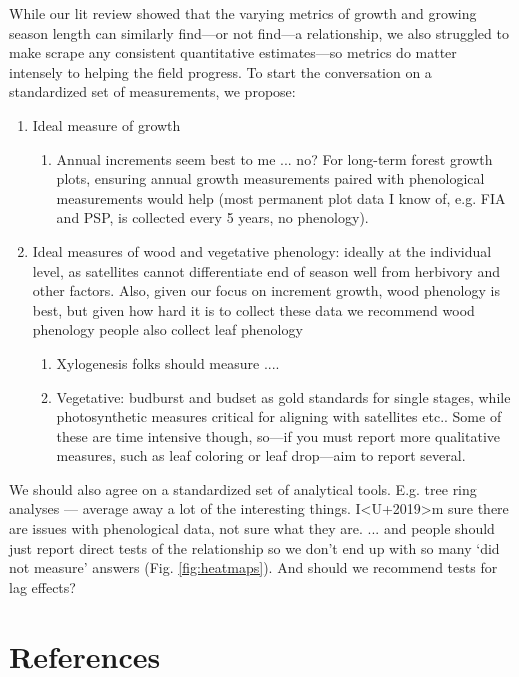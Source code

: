 \documentclass[11pt]{article}
\begin{document}
While our lit review showed that the varying metrics of growth and growing season length can similarly find---or not find---a relationship, we also struggled to make scrape any consistent quantitative estimates---so metrics do matter intensely to helping the field progress. To start the conversation on a standardized set of measurements, we propose:
\begin{enumerate}
\item Ideal measure of growth
\begin{enumerate}
\item Annual increments seem best to me ... no? For long-term forest growth plots, ensuring annual growth measurements paired with phenological measurements would help (most permanent plot data I know of, e.g. FIA and PSP, is collected every 5 years, no phenology). 
\end{enumerate}
\item Ideal measures of wood and vegetative phenology: ideally at the individual level, as satellites cannot differentiate end of season well from herbivory and other factors. Also, given our focus on increment growth, wood phenology is best, but given how hard it is to collect these data we recommend wood phenology people also collect leaf phenology
\begin{enumerate}
\item Xylogenesis folks should measure ....
\item Vegetative: budburst and budset as gold standards for single stages, while photosynthetic measures critical for aligning with satellites etc.. Some of these are time intensive though, so---if you must report more qualitative measures, such as leaf coloring or leaf drop---aim to report several.  
\end{enumerate}
\end{enumerate}

We should also agree on a standardized set of analytical tools. E.g. tree ring analyses --- average away a lot of the interesting things. I<U+2019>m sure there are issues with phenological data, not sure what they are. ... and people should just report direct tests of the relationship so we don't end up with so many `did not measure' answers (Fig. \ref{fig:heatmaps}). And should we recommend tests for lag effects?

\clearpage
\section*{References}


\end{document}
